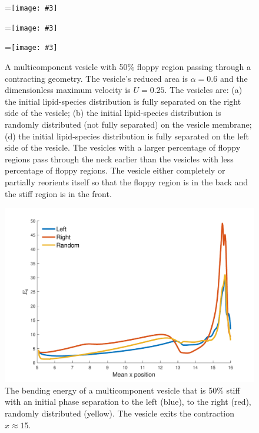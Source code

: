 \documentclass[twoside,twocolumn,9pt]{article}
\newcommand{\subfigimg}[3][,]{%
  \setbox1=\hbox{\texttt{[image: \#3]}}%
  \leavevmode\rlap{\usebox1}%
  \rlap{\hspace*{0pt}\raisebox{\dimexpr\ht1-0\baselineskip}{\bf
  \normalsize #2}}%
  \phantom{\usebox1}%
}
\begin{document}
\begin{figure}[H]
    \centering
    \subfigimg[width=\columnwidth,trim ={5cm .5cm 2cm .5cm},clip]{(a)}{figures/rightSep.pdf}
    \subfigimg[width=\columnwidth,trim ={5cm .5cm 2cm .5cm},clip]{(b)}{figures/randSep.pdf}
    \subfigimg[width=\columnwidth,trim ={5cm .5cm 2cm .5cm},clip]{(c)}{figures/leftSep.pdf}
  \caption{\label{fig:RA6leftRightRand} \small A multicomponent vesicle
  with 50\% floppy region passing through a contracting geometry. The
  vesicle's reduced area is $\alpha = 0.6$ and the dimensionless maximum
  velocity is $U = 0.25$. The vesicles are: (a) the initial
  lipid-species distribution is fully separated on the right side of the
  vesicle; (b) the initial lipid-species distribution is randomly
  distributed (not fully separated) on the vesicle membrane; (d) the
  initial lipid-species distribution is fully separated on the left side
  of the vesicle. The vesicles with a larger percentage of floppy
  regions pass through the neck earlier than the vesicles with less
  percentage of floppy regions. The vesicle either completely or
  partially reorients itself so that the floppy region is in the back
  and the stiff region is in the front.}
\end{figure}

\begin{figure}[H]
    \centering
    \includegraphics[width=\columnwidth]{figures/bending_leftRightRand.pdf}
    \caption{The bending energy of a multicomponent vesicle that is 50\% stiff with an initial phase separation to the left (blue), to the right (red), randomly distributed (yellow). The vesicle exits the contraction $x \approx 15$.}
    \label{fig:RAp6leftRightRandBending}
\end{figure}
\end{document}
